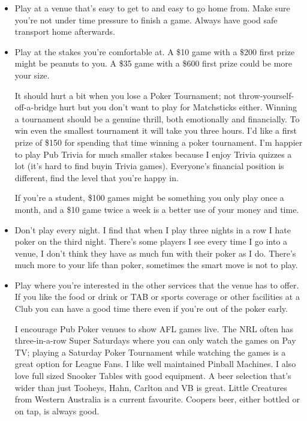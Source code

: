 \begin{itemize}

\item Play at a venue that's easy to get to and easy to go home
from. Make sure you're not under time pressure to finish a game.
Always have good safe transport home afterwards.

\item Play at the stakes you're comfortable at. A \$10
game with a \$200 first prize might be peanuts to you.
A \$35 game with a \$600 first prize could be more your size.

It should hurt a bit when you lose a Poker Tournament; not
throw-yourself-off-a-bridge hurt but you don't want to play for
Matchsticks either. Winning a tournament should be a genuine thrill,
both emotionally and financially. To win even the smallest tournament
it will take you three hours. I'd like a first prize of \$150 for
spending that time winning a poker tournament. I'm happier to play Pub
Trivia for much smaller stakes because I enjoy Trivia quizzes a lot
(it's hard to find buyin Trivia games). Everyone's financial
position is different, find the level that you're happy in.

If you're a student, \$100 games might be something
you only play once a month, and a \$10 game twice a week is
a better use of your money and time.

\item Don't play every night. I find that when I play
three nights in a row I hate poker on the third
night. There's some players I see every time I go into a venue,
I don't think they have as much fun with their poker as I do.
There's much more to your life than poker, sometimes the smart
move is not to play.

\item Play where you're interested in the other services
that the venue has to offer. If you like the food or drink or
TAB or sports coverage or other facilities at a Club you can
have a good time there even if you're out of the poker early.

I encourage Pub Poker venues to show
AFL games live. The NRL often has three-in-a-row Super Saturdays
where you can only watch the games on Pay TV; playing a Saturday
Poker Tournament while watching the games is a great option
for League Fans. I like well maintained
Pinball Machines. I also love full sized Snooker Tables with good
equipment. A beer selection that's wider than
just Tooheys, Hahn, Carlton and VB is great. Little Creatures from Western
Australia is a current favourite. Coopers beer, either bottled
or on tap, is always good.


\end{itemize}
